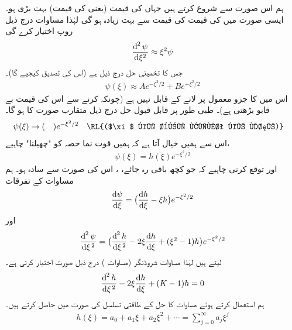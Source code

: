 ہم اس صورت سے شروع کرتے ہیں جہاں  کی قیمت (یعنی  کی قیمت) بہت بڑی ہو۔ ایسی صورت میں
 کی قیمت  کی قیمت سے بہت زیادہ ہو گی لہٰذا مساوات  درج ذیل روپ اختیار کرے گی
\begin{align}
\frac{\dif^{\,2}\psi}{\dif \xi^{2}}\approx \xi^{2}\psi
\end{align}
جس کا تخمینی حل درج ذیل ہے (اس کی تصدیق کیجیے گا)۔ 
\begin{align}\label{مساوات_غیر_تابع_وقت_متقارب_حل}
\psi(\xi)\approx Ae^{-\xi^{2}/2}+Be^{+\xi^{2}/2}
\end{align}
 اس میں  کا جزو معمول پر لانے کے قابل نہیں ہے (چونکہ  کرنے سے اس کی قیمت بے قابو بڑھتی ہے)۔ طبی طور پر قابل قبول حل درج ذیل متقارب صورت کا ہو گا۔
\begin{align}
\psi(\xi)&\to(\quad )e^{-\xi^{2}/2}&&\text{\RL{($\xi$ کی بڑی قیمت کے لئے)}}
\end{align}
اس سے ہمیں خیال آتا ہے کہ ہمیں قوت نما حصہ کو "چھیلنا" چاہیے،
\begin{align}\label{مساوات_شروڈنگر_متقارب_الف}
\psi(\xi)=h(\xi)e^{-\xi^{2}/2}
\end{align}
اور توقع کرنی چاہیے کہ جو کچھ باقی رہ جائے، ، اس کی صورت  سے سادہ ہو۔ ہم مساوات  کے تفرقات
\begin{align*}
\frac{\dif{\psi}}{\dif{\xi}}=\big(\frac{\dif{h}}{\dif{\xi}}-\xi h\big )e^{-\xi^{2}/2}
\end{align*}
اور
\begin{align*}
\frac{\dif^{\,2}{\psi}}{\dif{\xi^{\,2}}}=\big (\frac{\dif^{\,2}{h}}{\dif{\xi^{\,2}}}-2\xi\frac{\dif{h}}{\dif{\xi}}+(\xi^{2}-1)h\big )e^{-\xi^{2}/2}
\end{align*}
 لیتے ہیں لہٰذا مساوات شروڈنگر (مساوات ) درج ذیل صورت اختیار کرتی ہے۔
\begin{align}\label{مساوات_شروڈنگر_فروبنیوس_الف}
\frac{\dif^{\,2}{h}}{\dif{\xi^{\,2}}}-2\xi\frac{\dif{h}}{\dif{\xi}}+(K-1)h=0
\end{align}
ہم  استعمال کرتے ہوئے مساوات  کا حل  کے طاقتی تسلسل کی صورت میں حاصل کرتے ہیں۔ 
\begin{align}
h(\xi)=a_{0}+a_{1}\xi+a_{2}\xi^{2}+\cdots = \sum_{j=0}^{\infty}a_{j}\xi^{j}
\end{align}
